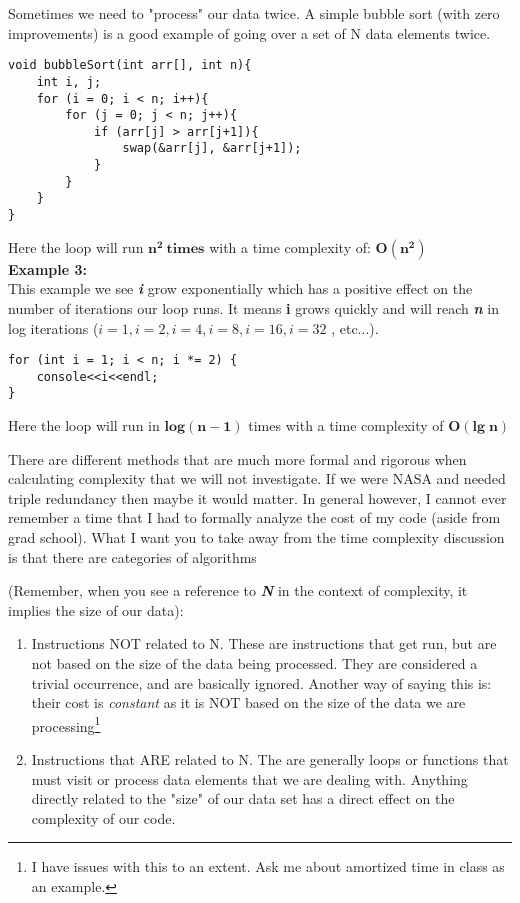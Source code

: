 Sometimes we need to "process" our data twice. A simple bubble sort (with zero improvements) is a good example of going over a set of N data elements twice.

\begin{verbatim}
void bubbleSort(int arr[], int n){  
    int i, j;  
    for (i = 0; i < n; i++){  
        for (j = 0; j < n; j++){
            if (arr[j] > arr[j+1]){
                swap(&arr[j], &arr[j+1]);
            }
        }
    }
} 
\end{verbatim}

Here the loop will run $\mathbf{n^2\: times}$ with a time complexity of: $\mathbf{O(n^2)}$\\

\textbf{Example 3:}\\

This example we see \textbf{\textit{i}} grow exponentially which has a positive effect on the number of iterations our loop runs. It means \textbf{\textbf{i}} grows quickly and will reach \textbf{\textit{n}} in log iterations ($i=1,i=2,i=4,i=8,i=16,i=32$ , etc...).

\begin{verbatim}
for (int i = 1; i < n; i *= 2) {
    console<<i<<endl;
}
\end{verbatim}

Here the loop will run in $\mathbf{log(n-1)}$ times with a time complexity of $\mathbf{O(lg\; n)}$\\


There are different methods that are much more formal and rigorous when calculating complexity that we will not investigate. If we were NASA and needed triple redundancy then maybe it would matter. In general however, I cannot ever remember a time that I had to formally analyze the cost of my code (aside from grad school).  What I want you to take away from the time complexity discussion is that there are categories of algorithms 

(Remember, when you see a reference to  \textbf{\textit{N}} in the context of complexity, it implies the size of our data):

\begin{enumerate}
    \item Instructions NOT related to N. These are instructions that get run, but are not based on the size of the data being processed. They are considered a trivial occurrence, and are basically ignored. Another way of saying this is: their cost is \textit{constant} as it is NOT based on the size of the data we are processing\footnote{I have issues with this to an extent. Ask me about amortized time in class as an example.}
    \item Instructions that ARE related to N. The are generally loops or functions that must visit or process data elements that we are dealing with. Anything directly related to the "size" of our data set has a direct effect on the complexity of our code. 
\end{enumerate}


